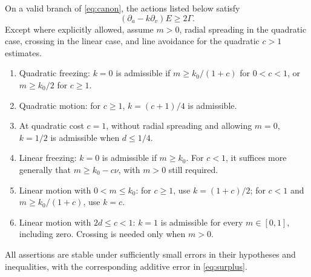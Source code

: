 \begin{proposition}\label{int:actions}
On a valid branch of \eqref{eq:canon}, the actions
listed below satisfy
\begin{equation}
 (\partial_a-k\partial_v)E\geq2\Gamma.
 \tag{surplus}\label{eq:surplus}
\end{equation}
Except where explicitly allowed, assume $m>0$,
radial spreading in the quadratic case, crossing
in the linear case, and line avoidance for
the quadratic $c>1$ estimates.
\begin{enumerate}[label=(\roman*)]
\item Quadratic freezing: $k=0$ is admissible if
$m\geq k_0/(1+c)$ for $0<c<1$, or
$m\geq k_0/2$ for $c\geq1$.
\item Quadratic motion: for $c\geq1$,
$k=(c+1)/4$ is admissible.
\item At quadratic cost $c=1$, without radial
spreading and allowing $m=0$, $k=1/2$ is
admissible when $d\leq1/4$.
\item Linear freezing: $k=0$ is admissible if
$m\geq k_0$. For $c<1$, it suffices more
generally that $m\geq k_0-c\nu$, with
$m>0$ still required.
\item Linear motion with $0<m\leq k_0$:
for $c\geq1$, use $k=(1+c)/2$; for
$c<1$ and $m\geq k_0/(1+c)$, use $k=c$.
\item Linear motion with $2d\leq c<1$:
$k=1$ is admissible for every $m\in[0,1]$,
including zero. Crossing is needed only
when $m>0$.
\end{enumerate}
All assertions are stable under sufficiently
small errors in their hypotheses and inequalities,
with the corresponding additive error in
\eqref{eq:surplus}.
\end{proposition}


